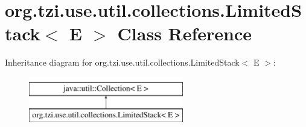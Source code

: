 \hypertarget{classorg_1_1tzi_1_1use_1_1util_1_1collections_1_1_limited_stack_3_01_e_01_4}{\section{org.\-tzi.\-use.\-util.\-collections.\-Limited\-Stack$<$ E $>$ Class Reference}
\label{classorg_1_1tzi_1_1use_1_1util_1_1collections_1_1_limited_stack_3_01_e_01_4}
}
Inheritance diagram for org.\-tzi.\-use.\-util.\-collections.\-Limited\-Stack$<$ E $>$\-:\begin{figure}[H]
\begin{center}
\leavevmode
\includegraphics[height=2.000000cm]{classorg_1_1tzi_1_1use_1_1util_1_1collections_1_1_limited_stack_3_01_e_01_4}
\end{center}
\end{figure}
